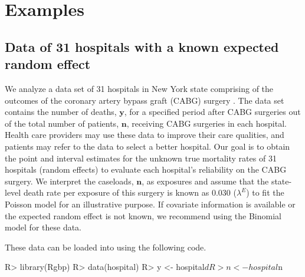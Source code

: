 \documentclass[article]{jss}
\begin{document}
\section[Examples]{Examples}\label{sec6}
\subsection[Known Second-level Mean]{Data of 31 hospitals with a known expected random effect}
\label{sec:ex:hosp}


We analyze a data set of 31 hospitals in New York state comprising of the outcomes of the coronary artery bypass graft (CABG) surgery \citep{morris2012}. The data set contains the number of deaths, $\boldsymbol{y}$, for a specified period after CABG surgeries out of the total number of patients, $\boldsymbol{n}$, receiving CABG surgeries in each hospital. Health care providers may use these data to improve their care qualities, and patients may refer to the data to select a better hospital. Our goal is to obtain the point and interval estimates for the unknown true mortality rates of 31 hospitals (random effects) to evaluate  each hospital's reliability on the CABG surgery. We interpret the caseloads, $\boldsymbol{n}$,  as exposures and assume that the state-level death rate per exposure of this surgery is known as 0.030 ($\lambda^E$) to fit the Poisson model for an illustrative purpose.  If covariate information is available or the expected random effect is not known, we recommend using the Binomial model for these data.


These data can be loaded into  using the following code.
\begin{CodeChunk}
\begin{CodeInput}
R> library(Rgbp)
R> data(hospital)
R> y <- hospital$d
R> n <- hospital$n
\end{CodeInput}
\end{CodeChunk}




\end{document}
